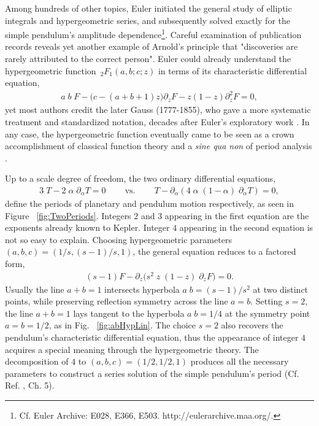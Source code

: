 \documentclass[nofootinbib,preprint]{revtex4-1}
\begin{document}
Among hundreds of other topics, Euler initiated the general study of elliptic integrals and 
hypergeometric series, and subsequently solved exactly for the simple pendulum's amplitude 
dependence\footnote{Cf. Euler Archive: E028, E366, E503. http://eulerarchive.maa.org/.}. Careful 
examination of publication records reveals yet another example of Arnold's principle that 
"discoveries are rarely attributed to the correct person". Euler could already understand 
the hypergeometric function $\,_2 F_1(a,b;c;z)$ in terms of its characteristic differential 
equation, 
\begin{eqnarray}
a \;b\; F - \big(c-(a+b+1)z\big) \partial_{z}F - z(1-z)\partial_{z}^2 F = 0,  \nonumber
\end{eqnarray}
yet most authors credit the later Gauss (1777-1855), who gave a more systematic treatment 
and standardized notation, decades after Euler's exploratory work \cite{DUTKA84}. In any case, 
the hypergeometric function eventually came to be seen as a crown accomplishment of classical 
function theory and a \textit{sine qua non} of period analysis \cite{KZ2001}. 

Up to a scale degree of freedom, the two ordinary differential equations,
\begin{eqnarray}
3\;T-2\;\alpha \;\partial_{\alpha}T=0 \;\;\;\;\;\;\;\; \text{vs.} \nonumber
 \;\;\;\;\;\;\;\; T-\partial_{\alpha}(4\;\alpha\;(1-\alpha)\;\partial_{\alpha}T)=0,
\end{eqnarray}
define the periods of planetary and pendulum motion respectively, as seen in Figure ~\ref{fig:TwoPeriods}.  
Integers $2$ and $3$ appearing in the first equation are the exponents already known to Kepler. 
Integer $4$ appearing in the second equation is not so easy to explain. Choosing hypergeometric parameters 
$(a,b,c)=(1/s,(s-1)/s,1)$, the general equation reduces to a factored form,
\begin{eqnarray}
(s-1)F-\partial_{z}\big(s^{2}\;z\;(1-z)\;\partial_{z}F\big)=0. \nonumber
\end{eqnarray}
Usually the line $a+b=1$ intersects hyperbola $a\;b=(s-1)/s^2$ at two distinct points, 
while preserving reflection symmetry across the line $a=b$. Setting $s=2$, the line $a+b=1$ 
lays tangent to the hyperbola $a\;b=1/4$ at the symmetry point $a=b=1/2$, as in Fig.
~\ref{fig:abHypLin}. The choice $s=2$ also recovers the pendulum's characteristic 
differential equation, thus the appearance of integer $4$ acquires a special meaning 
through the hypergeometric theory. The decomposition of $4$ to $(a,b,c)=(1/2,1/2,1)$ 
produces all the necessary parameters to construct a series solution of the simple 
pendulum's period (Cf. Ref. \cite{GRAHAM1994}, Ch. 5).
\end{document}
